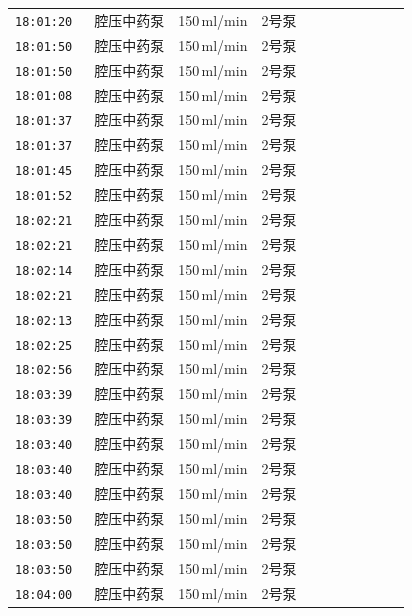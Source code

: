 \documentclass[UTF8,10pt,a4paper,fontset=fandol]{ctexart}
\begin{document}
\begin{center}
\small
\begin{tabular}{p{0.18\linewidth}p{0.72\linewidth}}
\texttt{18:01:20} & 腔压中药泵　150\,ml/min　2号泵\\
\texttt{18:01:50} & 腔压中药泵　150\,ml/min　2号泵\\
\texttt{18:01:50} & 腔压中药泵　150\,ml/min　2号泵\\
\texttt{18:01:08} & 腔压中药泵　150\,ml/min　2号泵\\
\texttt{18:01:37} & 腔压中药泵　150\,ml/min　2号泵\\
\texttt{18:01:37} & 腔压中药泵　150\,ml/min　2号泵\\
\texttt{18:01:45} & 腔压中药泵　150\,ml/min　2号泵\\
\texttt{18:01:52} & 腔压中药泵　150\,ml/min　2号泵\\
\texttt{18:02:21} & 腔压中药泵　150\,ml/min　2号泵\\
\texttt{18:02:21} & 腔压中药泵　150\,ml/min　2号泵\\
\texttt{18:02:14} & 腔压中药泵　150\,ml/min　2号泵\\
\texttt{18:02:21} & 腔压中药泵　150\,ml/min　2号泵\\
\texttt{18:02:13} & 腔压中药泵　150\,ml/min　2号泵\\
\texttt{18:02:25} & 腔压中药泵　150\,ml/min　2号泵\\
\texttt{18:02:56} & 腔压中药泵　150\,ml/min　2号泵\\
\texttt{18:03:39} & 腔压中药泵　150\,ml/min　2号泵\\
\texttt{18:03:39} & 腔压中药泵　150\,ml/min　2号泵\\
\texttt{18:03:40} & 腔压中药泵　150\,ml/min　2号泵\\
\texttt{18:03:40} & 腔压中药泵　150\,ml/min　2号泵\\
\texttt{18:03:40} & 腔压中药泵　150\,ml/min　2号泵\\
\texttt{18:03:50} & 腔压中药泵　150\,ml/min　2号泵\\
\texttt{18:03:50} & 腔压中药泵　150\,ml/min　2号泵\\
\texttt{18:03:50} & 腔压中药泵　150\,ml/min　2号泵\\
\texttt{18:04:00} & 腔压中药泵　150\,ml/min　2号泵\\
\end{tabular}

\vspace{1em}


\end{center}
\end{document}
